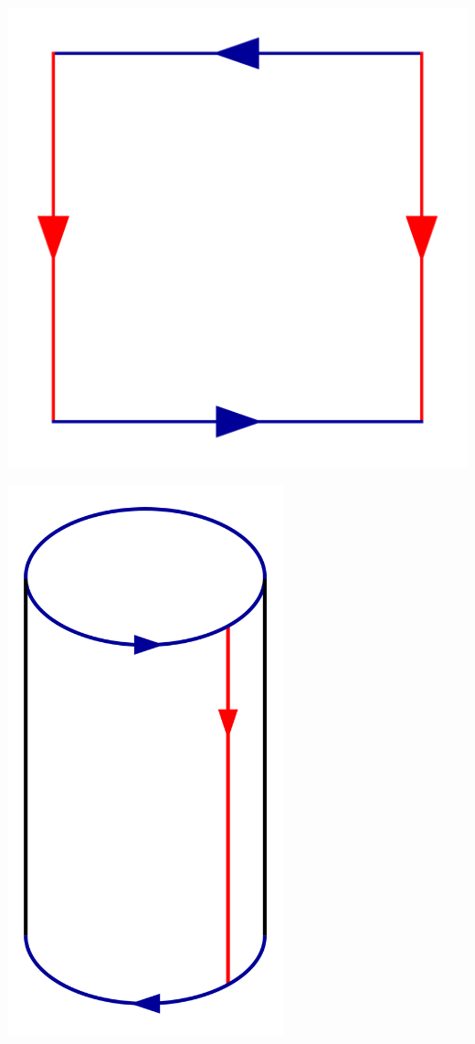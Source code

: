 \begin{example}
\begin{enumerate}[1)]
            \begin{minipage}{\textwidth}
                \centering
                \begin{minipage}{0.3\textwidth}
                        \includegraphics[width=\textwidth]{figures/1024px-Klein_Bottle_Folding_1.svg.png}
                \end{minipage}
                \begin{minipage}{0.3\textwidth}
                    \centering
                    \includegraphics[width=0.6\textwidth]{figures/800px-Klein_Bottle_Folding_2.svg.png}

\end{minipage}
\end{minipage}
\end{enumerate}
\end{example}

